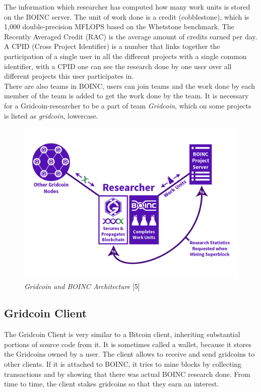 The information which researcher has computed how many work units is stored on the BOINC server. The unit of work done is a credit (cobblestone), which is 1,000 double-precision MFLOPS based on the Whetstone benchmark.  The Recently Averaged Credit (RAC) is the average amount of credits earned per day.\\

A CPID (Cross Project Identifier) is a number that links together the participation of a single user in all the different projects with a single common identifier, with a CPID one can see the research done by one user over all different projects this user participates in.\\

There are also teams in BOINC, users can join teams and the work done by each member of the team is added to get the work done by the team. It is necessary for a Gridcoin-researcher to be a part of team \textit{Gridcoin}, which on some projects is listed as \textit{gridcoin}, lowercase.

\begin{figure}
\centering
\includegraphics[scale=0.5]{figures/researcherdiagram_joshoeah}
\medskip
\caption{\textit{Gridcoin and BOINC Architecture} [5]}
\small
\end{figure}

\subsection{Gridcoin Client}

The Gridcoin Client is very similar to a Bitcoin client, inheriting substantial portions of source code from it. It is sometimes called a wallet, because it stores the Gridcoins owned by a user. The client allows to receive and send gridcoins to other clients. If it is attached to BOINC, it tries to mine blocks by collecting transactions and by showing that there was actual BOINC research done. From time to time, the client stakes gridcoins so that they earn an interest.

